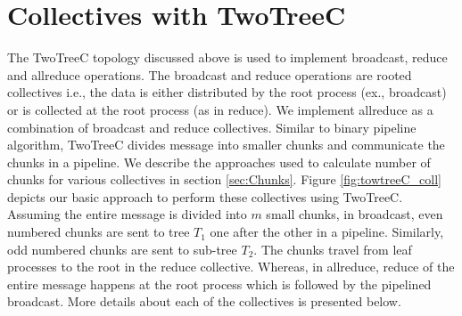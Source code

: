 \documentclass[sigplan,review,anonymous]{acmart}\settopmatter{printfolios=true,printccs=false,printacmref=false}
\begin{document}
\section{Collectives with TwoTreeC}\label{sec:Operations}
The TwoTreeC topology discussed above is used to implement broadcast, reduce and allreduce operations. The broadcast and reduce operations are rooted collectives i.e., the data is either distributed by the root process (ex., broadcast) or is collected at the root process (as in reduce). We implement allreduce as a combination of broadcast and reduce collectives. Similar to binary pipeline algorithm, TwoTreeC divides message into smaller chunks and communicate the chunks in a pipeline. We describe the approaches used to calculate number of chunks for various collectives in section \ref{sec:Chunks}.  Figure \ref{fig:towtreeC_coll} depicts our basic approach to perform these collectives using TwoTreeC. Assuming the entire message is divided into $m$ small chunks, in broadcast, even numbered chunks are sent to tree $T_1$ one after the other in a pipeline. Similarly, odd numbered chunks are sent to sub-tree $T_2$. The chunks travel from leaf processes to the root in the reduce collective. Whereas, in allreduce, reduce of the entire message happens at the root process which is followed by the pipelined broadcast. More details about each of the collectives is presented below.

\end{document}
